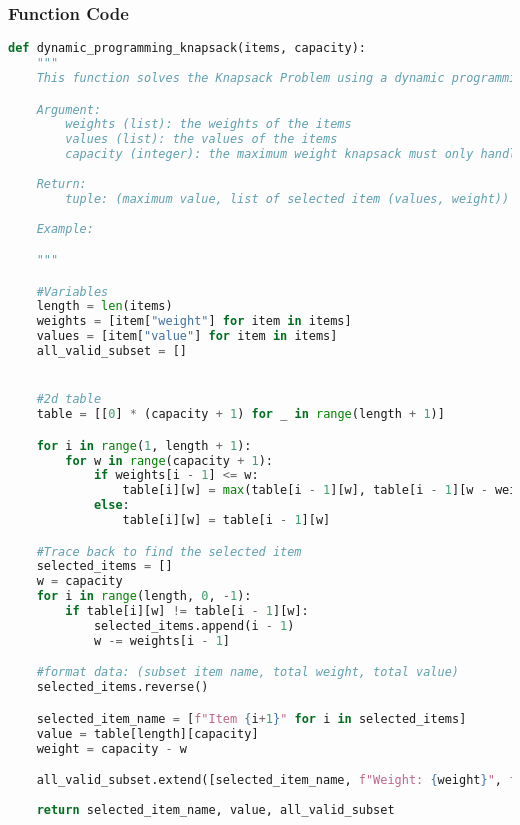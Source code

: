\documentclass{article}
\begin{document}
\subsubsection*{Function Code}
\begin{lstlisting}[language=Python]
def dynamic_programming_knapsack(items, capacity):
    """
    This function solves the Knapsack Problem using a dynamic programming approach. It creates a 2d table where each cell represents the best value achievable using a subset of items within a given capacity. This then pick an item based on which option gives a higher value.

    Argument:
        weights (list): the weights of the items
        values (list): the values of the items
        capacity (integer): the maximum weight knapsack must only handle
        
    Return:
        tuple: (maximum value, list of selected item (values, weight))
    
    Example:

    """

    #Variables
    length = len(items)
    weights = [item["weight"] for item in items]
    values = [item["value"] for item in items]
    all_valid_subset = []


    #2d table
    table = [[0] * (capacity + 1) for _ in range(length + 1)]

    for i in range(1, length + 1):
        for w in range(capacity + 1):
            if weights[i - 1] <= w:
                table[i][w] = max(table[i - 1][w], table[i - 1][w - weights[i - 1]] + values[i - 1])
            else:
                table[i][w] = table[i - 1][w]

    #Trace back to find the selected item
    selected_items = []
    w = capacity
    for i in range(length, 0, -1):
        if table[i][w] != table[i - 1][w]:
            selected_items.append(i - 1)
            w -= weights[i - 1]

    #format data: (subset item name, total weight, total value)
    selected_items.reverse()

    selected_item_name = [f"Item {i+1}" for i in selected_items]
    value = table[length][capacity]
    weight = capacity - w

    all_valid_subset.extend([selected_item_name, f"Weight: {weight}", f"Value: {value}"])
    
    return selected_item_name, value, all_valid_subset

\end{lstlisting}
\end{document}
